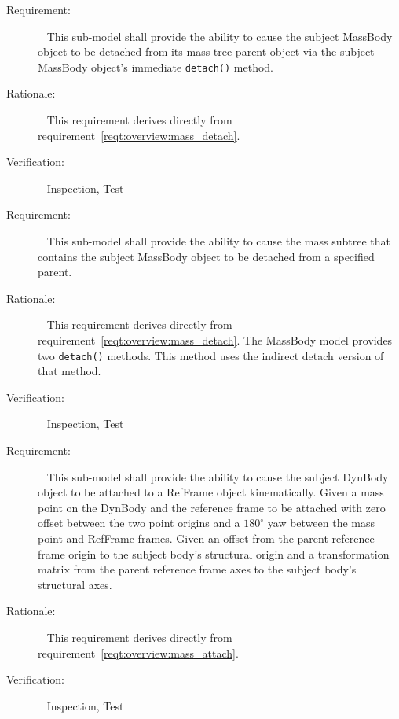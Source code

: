 \label{reqt:BodyAttach_Detach:detach_immediate}
\begin{description}
  \item[Requirement:]\ \newline
    This sub-model shall provide the ability to cause the subject MassBody
    object to be detached from its mass tree parent object via the subject
    MassBody object's immediate {\tt detach()} method.
  \item[Rationale:]\ \newline
    This requirement derives directly from
    requirement~\ref{reqt:overview:mass_detach}.
  \item[Verification:]\ \newline
    Inspection, Test
\end{description}

\label{reqt:BodyAttach_Detach:detach_specific}
\begin{description}
  \item[Requirement:]\ \newline
    This sub-model shall provide the ability to cause the mass subtree
    that contains the subject MassBody object to be detached
    from a specified parent.
  \item[Rationale:]\ \newline
    This requirement derives directly from
    requirement~\ref{reqt:overview:mass_detach}.
    The MassBody model provides two {\tt detach()} methods.
    This method uses the indirect detach version of that method.
  \item[Verification:]\ \newline
    Inspection, Test
\end{description}

\label{reqt:BodyAttach_Detach:ref_attach}
\begin{description}
  \item[Requirement:]\ \newline
    This sub-model shall provide the ability to cause the subject DynBody
    object to be attached to a RefFrame object kinematically.
    \label{reqt:BodyAttach_Detach:attach_point}
      Given a mass point on the DynBody and the reference frame to be attached with zero
      offset between the two point origins and a $180^{\circ}$ yaw
      between the mass point and RefFrame frames.
    \label{reqt:BodyAttach_Detach:attach_matrix}
      Given an offset from the parent reference frame origin to the
      subject body's structural origin and a transformation matrix from
      the parent reference frame axes to the subject body's structural axes.
  \item[Rationale:]\ \newline
    This requirement derives directly from
    requirement~\ref{reqt:overview:mass_attach}.
  \item[Verification:]\ \newline
    Inspection, Test
\end{description}
